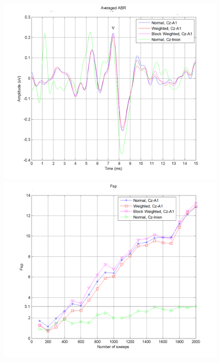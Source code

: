 \begin{figure}[H]
    \centering
    \begin{minipage}{0.48\textwidth}
        \includegraphics[width=\textwidth]{images/click75dbABR.png}
    \end{minipage}
    \hfill
    \begin{minipage}{0.48\textwidth}
        \includegraphics[width=\textwidth]{images/click75dbABRfsp.png}
    \end{minipage}
    
    \vspace{0.2cm}
    

\end{figure}
